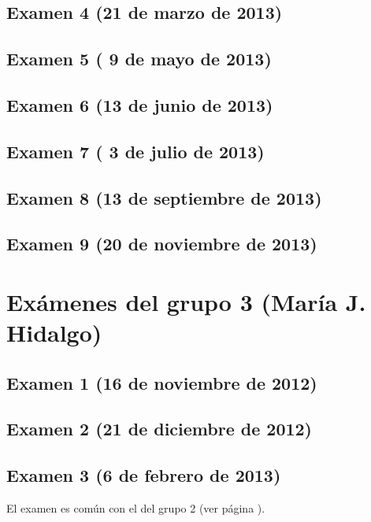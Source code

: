 \documentclass[a4paper,12pt,twoside]{book}
\begin{document}
\subsection{Examen 4 (21 de marzo de 2013)}
\subsection{Examen 5 ( 9 de mayo de 2013)}
\subsection{Examen 6 (13 de junio de 2013)} 
\subsection{Examen 7 ( 3 de julio de 2013)} 
\label{examen_12_13_2_7}
\subsection{Examen 8 (13 de septiembre de 2013)} 
\label{examen_12_13_2_8}
\subsection{Examen 9 (20 de noviembre de 2013)} 
\label{examen_12_13_2_9}

\section{Exámenes del grupo 3 (María J. Hidalgo)}
\subsection{Examen 1 (16 de noviembre de 2012)}
\subsection{Examen 2 (21 de diciembre de 2012)}
\subsection{Examen 3 (6 de febrero de 2013)}
El examen es común con el del grupo 2 (ver página \pageref{examen_12_13_2_3}).
\end{document}
